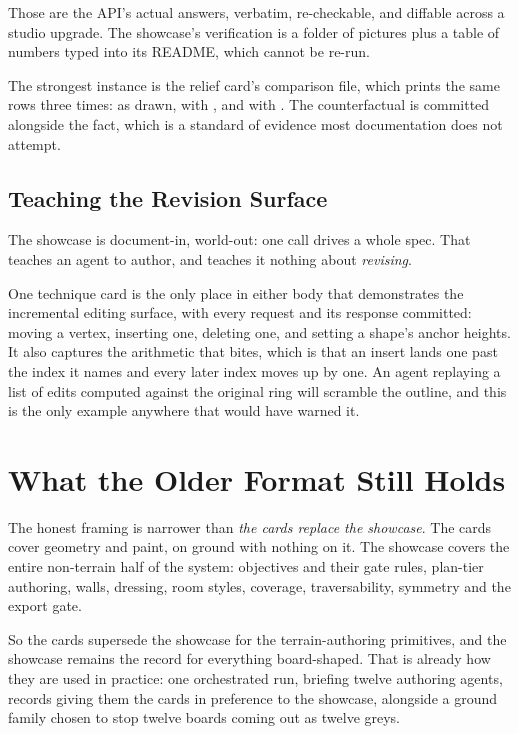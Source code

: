 Those are the API's actual answers, verbatim, re-checkable, and diffable across a
studio upgrade. The showcase's verification is a folder of pictures plus a table of
numbers typed into its README, which cannot be re-run.

The strongest instance is the relief card's comparison file, which prints the same
rows three times: as drawn, with , and with . The
counterfactual is committed alongside the fact, which is a standard of evidence
most documentation does not attempt.

\subsection{Teaching the Revision Surface}

The showcase is document-in, world-out: one call drives a whole spec. That teaches
an agent to author, and teaches it nothing about \emph{revising}.

One technique card is the only place in either body that demonstrates the
incremental editing surface, with every request and its response committed: moving
a vertex, inserting one, deleting one, and setting a shape's anchor heights. It
also captures the arithmetic that bites, which is that an insert lands one past the
index it names and every later index moves up by one. An agent replaying a list of
edits computed against the original ring will scramble the outline, and this is the
only example anywhere that would have warned it.

\section{What the Older Format Still Holds}

The honest framing is narrower than \emph{the cards replace the showcase}. The
cards cover geometry and paint, on ground with nothing on it. The showcase covers
the entire non-terrain half of the system: objectives and their gate rules,
plan-tier authoring, walls, dressing, room styles, coverage, traversability,
symmetry and the export gate.

So the cards supersede the showcase for the terrain-authoring primitives, and the
showcase remains the record for everything board-shaped. That is already how they
are used in practice: one orchestrated run, briefing twelve authoring agents,
records giving them the cards in preference to the showcase, alongside a ground
family chosen to stop twelve boards coming out as twelve greys.

